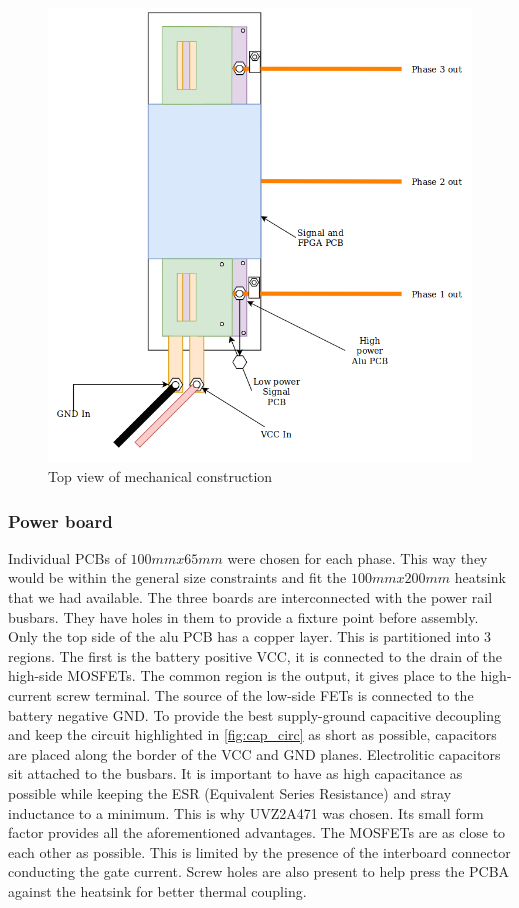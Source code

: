 \begin{figure}[H]
	\centering
	\includegraphics[width=1\textwidth]{pictures/hardware/Power_Board/mechanical_top_new.png}
	\caption{Top view of mechanical construction}
	\label{fig:mech_top}
\end{figure}



\subsubsection{Power board}

Individual PCBs of $100mm x 65mm$ were chosen for each phase. This way they would be within the general size constraints and fit the $100mm x 200mm$ heatsink that we had available. The three boards are interconnected with the power rail busbars. They have holes in them to provide a fixture point before assembly. Only the top side of the alu PCB has a copper layer. This is partitioned into 3 regions. The first is the battery positive VCC, it is connected to the drain of the high-side MOSFETs. The common region is the output, it gives place to the high-current screw terminal. The source of the low-side FETs is connected to the battery negative GND. To provide the best supply-ground capacitive decoupling and keep the circuit highlighted in \ref{fig:cap_circ} as short as possible, capacitors are placed along the border of the VCC and GND planes. Electrolitic capacitors sit attached to the busbars. It is important to have as high capacitance as possible while keeping the ESR (Equivalent Series Resistance) and stray inductance to a minimum. This is why UVZ2A471\cite{elco} was chosen. Its small form factor provides all the aforementioned advantages. The MOSFETs are as close to each other as possible. This is limited by the presence of the interboard connector conducting the gate current. Screw holes are also present to help press the PCBA against the heatsink for better thermal coupling.

